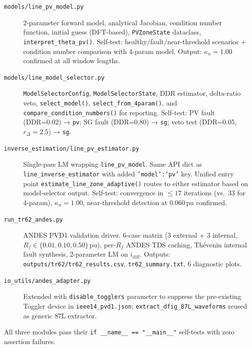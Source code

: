 \documentclass[11pt, a4paper]{article}
\newcommand{\kn}{\kappa_n}
\begin{document}
\begin{description}
  \item[\texttt{models/line\_pv\_model.py}]
    2-parameter forward model, analytical Jacobian, condition number function,
    initial guess (DFT-based), \texttt{PVZoneState} dataclass,
    \texttt{interpret\_theta\_pv()}.
    Self-test: healthy/fault/near-threshold scenarios + condition number
    comparison with 4-param model.  Output: $\kn = 1.00$ confirmed at all
    window lengths.

  \item[\texttt{models/line\_model\_selector.py}]
    \texttt{ModelSelectorConfig}, \texttt{ModelSelectorState}, DDR estimator,
    delta-ratio veto, \texttt{select\_model()}, \texttt{select\_from\_4param()},
    and \texttt{compare\_condition\_numbers()} for reporting.
    Self-test: PV fault (DDR=0.02) → \texttt{pv}; SG fault (DDR=0.80) → \texttt{sg};
    veto test (DDR=0.05, $r_\Delta=2.5$) → \texttt{sg}.

  \item[\texttt{inverse\_estimation/line\_pv\_estimator.py}]
    Single-pass LM wrapping \texttt{line\_pv\_model}.  Same API dict as
    \texttt{line\_inverse\_estimator} with added \texttt{'model':'pv'} key.
    Unified entry point \texttt{estimate\_line\_zone\_adaptive()} routes
    to either estimator based on model-selector output.
    Self-test: convergence in $\leq 17$ iterations (vs.\ 33 for 4-param),
    $\kn = 1.00$, near-threshold detection at 0.060\,pu confirmed.

  \item[\texttt{run\_tr62\_andes.py}]
    ANDES PVD1 validation driver.  6-case matrix (3 external + 3 internal,
    $R_f \in \{0.01, 0.10, 0.50\}$\,pu), per-$R_f$ ANDES TDS caching,
    Th\'evenin internal fault synthesis, 2-parameter LM on $i_\text{diff}$.
    Outputs: \texttt{outputs/tr62/tr62\_results.csv},
    \texttt{tr62\_summary.txt}, 6 diagnostic plots.

  \item[\texttt{io\_utils/andes\_adapter.py}]
    Extended with \texttt{disable\_togglers} parameter to suppress the
    pre-existing Toggler device in \texttt{ieee14\_pvd1.json};
    \texttt{extract\_dfig\_87L\_waveforms} reused as generic 87L extractor.
\end{description}

All three modules pass their \texttt{if \_\_name\_\_ == "\_\_main\_\_"} self-tests
with zero assertion failures.

\end{document}
